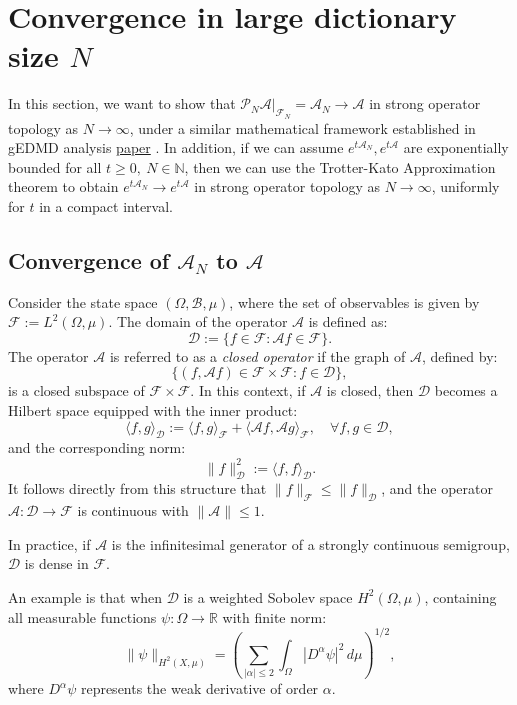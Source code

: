 \documentclass{article}[11]
\begin{document}
\section{Convergence in large dictionary size $N$}
In this section, we want to show that $\mathcal{P}_N\mathcal{A}|_{\mathcal{F}_N} = \mathcal{A}_N \to \mathcal{A}$ in strong operator topology as $N \to \infty$, under a similar mathematical framework established in gEDMD analysis \href{https://arxiv.org/abs/2405.00539}{paper} . In addition, if we can assume $e^{t\mathcal{A}_N}, e^{t\mathcal{A}}$ are exponentially bounded for all $t\geq 0, \ N\in\mathbb{N}$, then we can use the Trotter-Kato Approximation theorem to obtain $e^{t\mathcal{A}_N} \to e^{t\mathcal{A}}$ in strong operator topology as $N \to \infty$, uniformly for $t$ in a compact interval.


\subsection{Convergence of \(\mathcal{A}_N\) to \(\mathcal{A}\)}

Consider the state space \( (\Omega, \mathcal{B}, \mu) \), where the set of observables is given by \( \mathcal{F} := L^2(\Omega, \mu) \). The domain of the operator \( \mathcal{A} \) is defined as:
\[
\mathcal{D} := \{ f \in \mathcal{F} : \mathcal{A} f \in \mathcal{F} \}.
\]
The operator \( \mathcal{A} \) is referred to as a \textit{closed operator} if the graph of \( \mathcal{A} \), defined by:
\[
\{ (f, \mathcal{A} f) \in \mathcal{F} \times \mathcal{F} : f \in \mathcal{D} \},
\]
is a closed subspace of \( \mathcal{F} \times \mathcal{F} \). In this context, if \( \mathcal{A} \) is closed, then \( \mathcal{D} \) becomes a Hilbert space equipped with the inner product:
\[
\langle f, g \rangle_\mathcal{D} := \langle f, g \rangle_{\mathcal{F}} + \langle \mathcal{A} f, \mathcal{A} g \rangle_{\mathcal{F}}, \quad \forall f, g \in \mathcal{D},
\]
and the corresponding norm:
\[
\| f \|_\mathcal{D}^2 := \langle f, f \rangle_\mathcal{D}.
\]
It follows directly from this structure that \( \| f \|_{\mathcal{F}} \leq \| f \|_\mathcal{D} \), and the operator \( \mathcal{A} : \mathcal{D} \to \mathcal{F} \) is continuous with \( \| \mathcal{A} \| \leq 1 \).

In practice, if \( \mathcal{A} \) is the infinitesimal generator of a strongly continuous semigroup, \( \mathcal{D} \) is dense in \( \mathcal{F} \).

An example is that when \( \mathcal{D} \) is a weighted Sobolev space \( H^2(\Omega, \mu) \), containing all measurable functions \( \psi: \Omega \to \mathbb{R} \) with finite norm:
\[
\| \psi \|_{H^2(X, \mu)} = \left( \sum_{|\alpha| \leq 2} \int_\Omega |D^\alpha \psi|^2 \, d\mu \right)^{1/2},
\]
where \( D^\alpha \psi \) represents the weak derivative of order \( \alpha \). 
\end{document}

